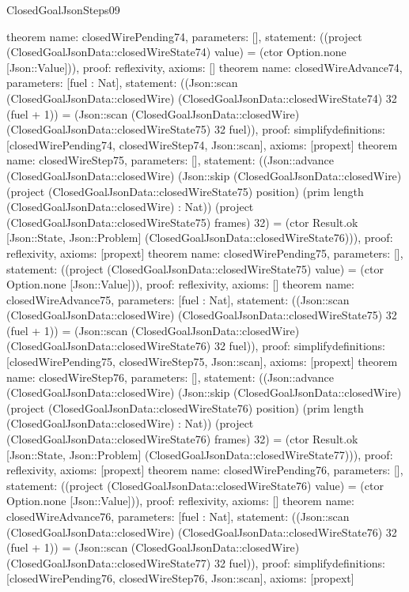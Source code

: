 \begin{lexlean}{ClosedGoalJsonSteps09}
\begin{semanticmodule}
{}
theorem{
 name: closedWirePending74, parameters: [],
 statement: ((project (ClosedGoalJsonData::closedWireState74) value) = (ctor Option.none [Json::Value])), proof: reflexivity{}, axioms: []
}
theorem{
 name: closedWireAdvance74, parameters: [fuel : Nat],
 statement: ((Json::scan (ClosedGoalJsonData::closedWire) (ClosedGoalJsonData::closedWireState74) 32 (fuel + 1)) = (Json::scan (ClosedGoalJsonData::closedWire) (ClosedGoalJsonData::closedWireState75) 32 fuel)), proof: simplify{definitions: [closedWirePending74, closedWireStep74, Json::scan]}, axioms: [propext]
}
theorem{
 name: closedWireStep75, parameters: [],
 statement: ((Json::advance (ClosedGoalJsonData::closedWire) (Json::skip (ClosedGoalJsonData::closedWire) (project (ClosedGoalJsonData::closedWireState75) position) (prim length (ClosedGoalJsonData::closedWire) : Nat)) (project (ClosedGoalJsonData::closedWireState75) frames) 32) = (ctor Result.ok [Json::State, Json::Problem] (ClosedGoalJsonData::closedWireState76))), proof: reflexivity{}, axioms: [propext]
}
theorem{
 name: closedWirePending75, parameters: [],
 statement: ((project (ClosedGoalJsonData::closedWireState75) value) = (ctor Option.none [Json::Value])), proof: reflexivity{}, axioms: []
}
theorem{
 name: closedWireAdvance75, parameters: [fuel : Nat],
 statement: ((Json::scan (ClosedGoalJsonData::closedWire) (ClosedGoalJsonData::closedWireState75) 32 (fuel + 1)) = (Json::scan (ClosedGoalJsonData::closedWire) (ClosedGoalJsonData::closedWireState76) 32 fuel)), proof: simplify{definitions: [closedWirePending75, closedWireStep75, Json::scan]}, axioms: [propext]
}
theorem{
 name: closedWireStep76, parameters: [],
 statement: ((Json::advance (ClosedGoalJsonData::closedWire) (Json::skip (ClosedGoalJsonData::closedWire) (project (ClosedGoalJsonData::closedWireState76) position) (prim length (ClosedGoalJsonData::closedWire) : Nat)) (project (ClosedGoalJsonData::closedWireState76) frames) 32) = (ctor Result.ok [Json::State, Json::Problem] (ClosedGoalJsonData::closedWireState77))), proof: reflexivity{}, axioms: [propext]
}
theorem{
 name: closedWirePending76, parameters: [],
 statement: ((project (ClosedGoalJsonData::closedWireState76) value) = (ctor Option.none [Json::Value])), proof: reflexivity{}, axioms: []
}
theorem{
 name: closedWireAdvance76, parameters: [fuel : Nat],
 statement: ((Json::scan (ClosedGoalJsonData::closedWire) (ClosedGoalJsonData::closedWireState76) 32 (fuel + 1)) = (Json::scan (ClosedGoalJsonData::closedWire) (ClosedGoalJsonData::closedWireState77) 32 fuel)), proof: simplify{definitions: [closedWirePending76, closedWireStep76, Json::scan]}, axioms: [propext]
}
\end{semanticmodule}
\end{lexlean}
